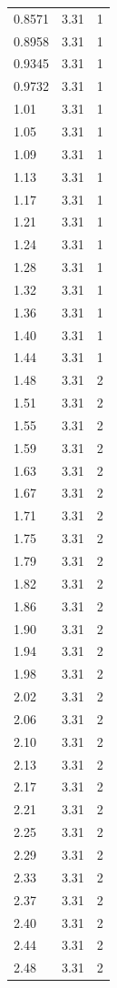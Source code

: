 \begin{longtable}{lrr}
  0.8571 & 3.31 & 1 \\
  0.8958 & 3.31 & 1 \\
  0.9345 & 3.31 & 1 \\
  0.9732 & 3.31 & 1 \\
  1.01 & 3.31 & 1 \\
  1.05 & 3.31 & 1 \\
  1.09 & 3.31 & 1 \\
  1.13 & 3.31 & 1 \\
  1.17 & 3.31 & 1 \\
  1.21 & 3.31 & 1 \\
  1.24 & 3.31 & 1 \\
  1.28 & 3.31 & 1 \\
  1.32 & 3.31 & 1 \\
  1.36 & 3.31 & 1 \\
  1.40 & 3.31 & 1 \\
  1.44 & 3.31 & 1 \\
  1.48 & 3.31 & 2 \\
  1.51 & 3.31 & 2 \\
  1.55 & 3.31 & 2 \\
  1.59 & 3.31 & 2 \\
  1.63 & 3.31 & 2 \\
  1.67 & 3.31 & 2 \\
  1.71 & 3.31 & 2 \\
  1.75 & 3.31 & 2 \\
  1.79 & 3.31 & 2 \\
  1.82 & 3.31 & 2 \\
  1.86 & 3.31 & 2 \\
  1.90 & 3.31 & 2 \\
  1.94 & 3.31 & 2 \\
  1.98 & 3.31 & 2 \\
  2.02 & 3.31 & 2 \\
  2.06 & 3.31 & 2 \\
  2.10 & 3.31 & 2 \\
  2.13 & 3.31 & 2 \\
  2.17 & 3.31 & 2 \\
  2.21 & 3.31 & 2 \\
  2.25 & 3.31 & 2 \\
  2.29 & 3.31 & 2 \\
  2.33 & 3.31 & 2 \\
  2.37 & 3.31 & 2 \\
  2.40 & 3.31 & 2 \\
  2.44 & 3.31 & 2 \\
  2.48 & 3.31 & 2 \\

\end{longtable}
